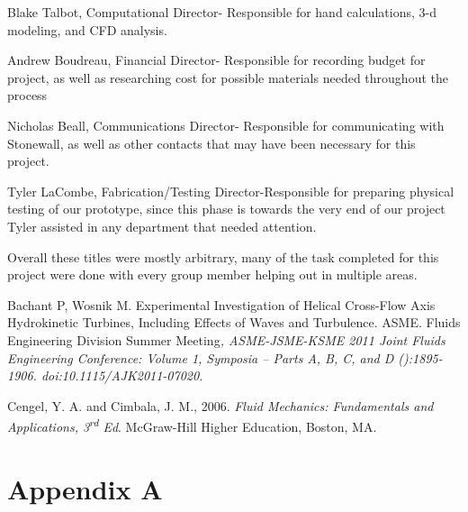 \documentclass[12pt]{article}
\begin{document}
Blake Talbot, Computational Director- Responsible for hand calculations, 3-d modeling, and CFD analysis.

Andrew Boudreau, Financial Director- Responsible for recording budget for project, as well as researching cost for possible materials needed throughout the process

Nicholas Beall, Communications Director- Responsible for communicating with Stonewall, as well as other contacts that may have been necessary for this project.

Tyler LaCombe, Fabrication/Testing Director-Responsible for preparing physical testing of our prototype, since this phase is towards the very end of our project Tyler assisted in any department that needed attention.

\hspace{0.5in}Overall these titles were mostly arbitrary, many of the task completed for this project were done with every group member helping out in multiple areas.
\newpage
%
%
\begin{thebibliography}{9}
%
Bachant P, Wosnik M. Experimental Investigation of Helical Cross-Flow Axis Hydrokinetic Turbines, Including Effects of Waves and Turbulence. ASME. Fluids Engineering Division Summer Meeting\textit{, ASME-JSME-KSME 2011 Joint Fluids Engineering Conference: Volume 1, Symposia – Parts A, B, C, and D ():1895-1906. doi:10.1115/AJK2011-07020.} 

Cengel, Y. A. and Cimbala, J. M., 2006.
\textit{Fluid Mechanics: Fundamentals and Applications, 3\textsuperscript{rd} Ed}. 
McGraw-Hill Higher Education, Boston, MA.


\end{thebibliography}

\newpage

\section*{Appendix A}
\label{sec:a}
\vspace{0.2in}
\end{document}
